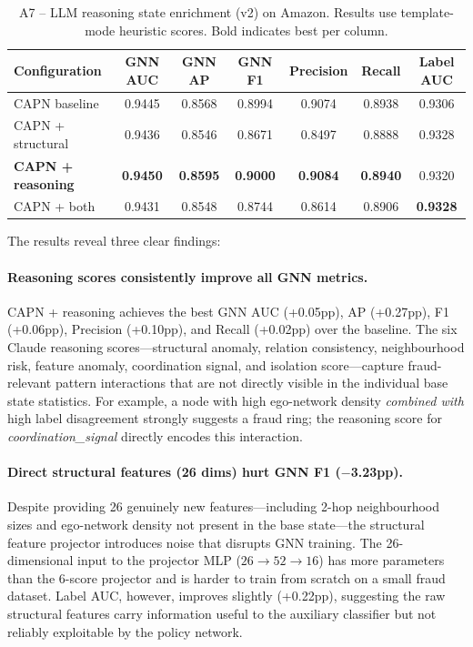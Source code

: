 \begin{table}[h!]
\centering
\begin{tabular}{lcccccc}
\toprule
\textbf{Configuration} & \textbf{GNN AUC} & \textbf{GNN AP} & \textbf{GNN F1} & \textbf{Precision} & \textbf{Recall} & \textbf{Label AUC} \\
\midrule
CAPN baseline           & 0.9445 & 0.8568 & 0.8994 & 0.9074 & 0.8938 & 0.9306 \\
CAPN + structural       & 0.9436 & 0.8546 & 0.8671 & 0.8497 & 0.8888 & 0.9328 \\
\textbf{CAPN + reasoning} & \textbf{0.9450} & \textbf{0.8595} & \textbf{0.9000} & \textbf{0.9084} & \textbf{0.8940} & 0.9320 \\
CAPN + both             & 0.9431 & 0.8548 & 0.8744 & 0.8614 & 0.8906 & \textbf{0.9328} \\
\bottomrule
\end{tabular}
\caption{A7 -- LLM reasoning state enrichment (v2) on Amazon. Results use template-mode heuristic scores. Bold indicates best per column.}
\label{tab:a7-enrichment}
\end{table}

\noindent
The results reveal three clear findings:

\paragraph{Reasoning scores consistently improve all GNN metrics.}
CAPN + reasoning achieves the best GNN AUC (+0.05pp), AP (+0.27pp), F1 (+0.06pp), Precision (+0.10pp), and Recall (+0.02pp) over the baseline. The six Claude reasoning scores---structural anomaly, relation consistency, neighbourhood risk, feature anomaly, coordination signal, and isolation score---capture fraud-relevant pattern interactions that are not directly visible in the individual base state statistics. For example, a node with high ego-network density \emph{combined with} high label disagreement strongly suggests a fraud ring; the reasoning score for \textit{coordination\_signal} directly encodes this interaction.

\paragraph{Direct structural features (26 dims) hurt GNN F1 ($-$3.23pp).}
Despite providing 26 genuinely new features---including 2-hop neighbourhood sizes and ego-network density not present in the base state---the structural feature projector introduces noise that disrupts GNN training. The 26-dimensional input to the projector MLP ($26 \to 52 \to 16$) has more parameters than the 6-score projector and is harder to train from scratch on a small fraud dataset. Label AUC, however, improves slightly (+0.22pp), suggesting the raw structural features carry information useful to the auxiliary classifier but not reliably exploitable by the policy network.

